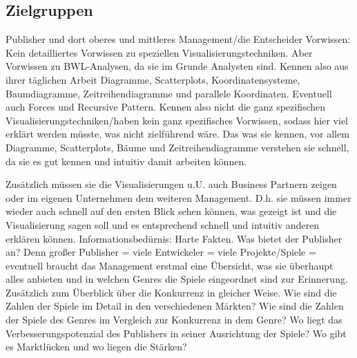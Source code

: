 \documentclass[usegeometry=true]{scrartcl}
\begin{document}

\subsection{Zielgruppen}
Publisher und dort oberes und mittleres Management/die Entscheider
Vorwissen: Kein detailliertes Vorwissen zu speziellen Visualisierungstechniken. Aber Vorwissen zu BWL-Analysen, da sie im Grunde Analysten sind. 
Kennen also aus ihrer täglichen Arbeit Diagramme, Scatterplots, Koordinatensysteme, Baumdiagramme, Zeitreihendiagramme und parallele Koordinaten. 
Eventuell auch Forces und Recursive Pattern. Kennen also nicht die ganz spezifischen Visualisierungstechniken/haben kein ganz spezifisches Vorwissen, sodass hier viel erklärt werden müsste, was nicht zielführend wäre. 
Das was sie kennen, vor allem Diagramme, Scatterplots, Bäume und Zeitreihendiagramme verstehen sie schnell, da sie es gut kennen und intuitiv damit arbeiten können. 

Zusätzlich müssen sie die Visualisierungen u.U. auch Business Partnern zeigen oder im eigenen Unternehmen dem weiteren Management. D.h. sie müssen immer wieder auch schnell auf den ersten Blick sehen können, was gezeigt ist und die Visualisierung sagen soll und es entsprechend schnell und intuitiv anderen erklären können. 
Informationsbedürnis: Harte Fakten. Was bietet der Publisher an? 
Denn großer Publisher = viele Entwickeler = viele Projekte/Spiele = eventuell braucht das Management erstmal eine Übersicht, was sie überhaupt alles anbieten und in welchen Genres die Spiele eingeordnet sind zur Erinnerung. 
Zusätzlich zum Überblick über die Konkurrenz in gleicher Weise. Wie sind die Zahlen der Spiele im Detail in den verschiedenen Märkten? 
Wie sind die Zahlen der Spiele des Genres im Vergleich zur Konkurrenz in dem Genre? Wo liegt das Verbesserungspotenzial des Publishers in seiner Ausrichtung der Spiele? 
Wo gibt es Marktlücken und wo liegen die Stärken? 

\end{document}

